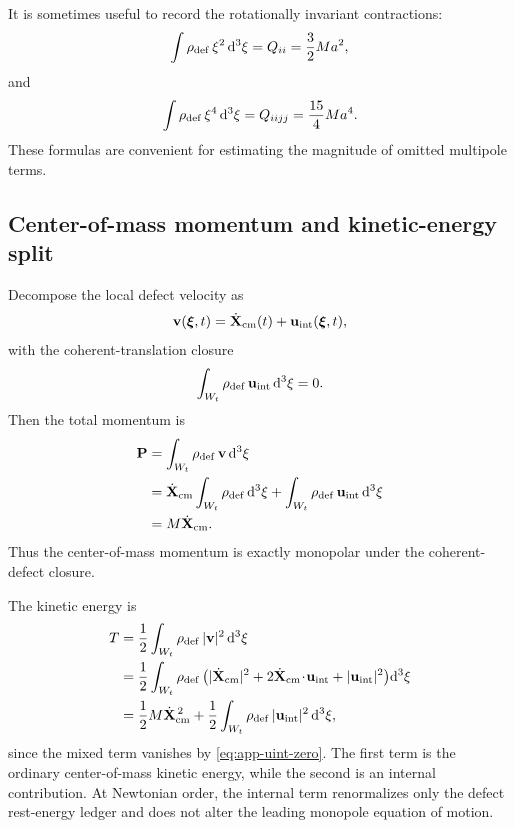 \documentclass[11pt]{article}
\newcommand{\dd}{\mathrm d}
\newcommand{\vct}{\mathbf v}
\begin{document}
It is sometimes useful to record the rotationally invariant contractions:
\begin{equation}
\int \rho_{\rm def}\,\xi^2\,\dd^3\xi
=
Q_{ii}
=
\frac{3}{2}Ma^2,
\label{eq:app-xisq-mean}
\end{equation}
and
\begin{equation}
\int \rho_{\rm def}\,\xi^4\,\dd^3\xi
=
Q_{iijj}
=
\frac{15}{4}Ma^4.
\label{eq:app-xi4-mean}
\end{equation}
These formulas are convenient for estimating the magnitude of omitted multipole terms.

\subsection{Center-of-mass momentum and kinetic-energy split}
\label{app:moments-kinematics}

Decompose the local defect velocity as
\begin{equation}
\vct(\boldsymbol{\xi},t)
=
\dot{\mathbf X}_{\rm cm}(t)
+
\mathbf u_{\rm int}(\boldsymbol{\xi},t),
\label{eq:app-v-split}
\end{equation}
with the coherent-translation closure
\begin{equation}
\int_{W_t}\rho_{\rm def}\,\mathbf u_{\rm int}\,\dd^3\xi=0.
\label{eq:app-uint-zero}
\end{equation}
Then the total momentum is
\begin{align}
\mathbf P
&=
\int_{W_t}\rho_{\rm def}\,\vct\,\dd^3\xi
\nonumber\\
&=
\dot{\mathbf X}_{\rm cm}\int_{W_t}\rho_{\rm def}\,\dd^3\xi
+
\int_{W_t}\rho_{\rm def}\,\mathbf u_{\rm int}\,\dd^3\xi
\nonumber\\
&=
M\dot{\mathbf X}_{\rm cm}.
\label{eq:app-total-momentum}
\end{align}
Thus the center-of-mass momentum is exactly monopolar under the coherent-defect closure.

The kinetic energy is
\begin{align}
T
&=
\frac12\int_{W_t}\rho_{\rm def}\,|\vct|^2\,\dd^3\xi
\nonumber\\
&=
\frac12\int_{W_t}\rho_{\rm def}\,
\bigl(
|\dot{\mathbf X}_{\rm cm}|^2
+
2\dot{\mathbf X}_{\rm cm}\!\cdot\!\mathbf u_{\rm int}
+
|\mathbf u_{\rm int}|^2
\bigr)\dd^3\xi
\nonumber\\
&=
\frac12 M\dot{\mathbf X}_{\rm cm}^{\,2}
+
\frac12\int_{W_t}\rho_{\rm def}\,|\mathbf u_{\rm int}|^2\,\dd^3\xi,
\label{eq:app-kinetic-split}
\end{align}
since the mixed term vanishes by \eqref{eq:app-uint-zero}. The first term is the ordinary
center-of-mass kinetic energy, while the second is an internal contribution. At Newtonian
order, the internal term renormalizes only the defect rest-energy ledger and does not
alter the leading monopole equation of motion.
\end{document}
